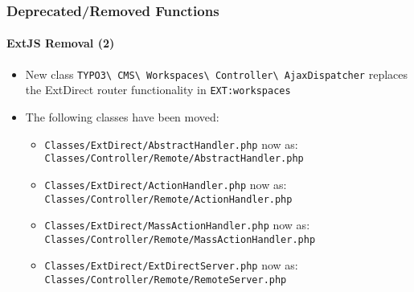 \begin{frame}[fragile]
	\frametitle{Deprecated/Removed Functions}
	\framesubtitle{ExtJS Removal (2)}

	\begin{itemize}
		\item New class
			\texttt{TYPO3\textbackslash
				CMS\textbackslash
				Workspaces\textbackslash
				Controller\textbackslash
				AjaxDispatcher}
			replaces the ExtDirect router functionality in \texttt{EXT:workspaces}

		\item The following classes have been moved:

		\begin{itemize}
			\item \smaller\texttt{Classes/ExtDirect/AbstractHandler.php}\newline
				now as: \texttt{Classes/Controller/Remote/AbstractHandler.php}\normalsize

			\item \smaller\texttt{Classes/ExtDirect/ActionHandler.php}\newline
				now as: \texttt{Classes/Controller/Remote/ActionHandler.php}\normalsize

			\item \smaller\texttt{Classes/ExtDirect/MassActionHandler.php}\newline
				now as: \texttt{Classes/Controller/Remote/MassActionHandler.php}\normalsize

			\item \smaller\texttt{Classes/ExtDirect/ExtDirectServer.php}\newline
				now as: \texttt{Classes/Controller/Remote/RemoteServer.php}\normalsize

		\end{itemize}

	\end{itemize}

\end{frame}
